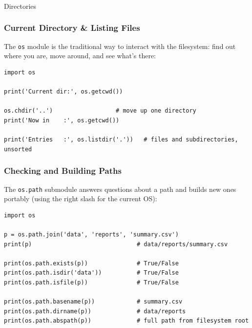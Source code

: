 \begin{frame}[fragile]\frametitle{}
\begin{center}
{\Large Directories}
\end{center}
\end{frame}

\begin{frame}[fragile]\frametitle{Current Directory \& Listing Files}
The \texttt{os} module is the traditional way to interact with the filesystem: find out where
you are, move around, and see what's there:
\begin{lstlisting}
import os

print('Current dir:', os.getcwd())

os.chdir('..')                  # move up one directory
print('Now in    :', os.getcwd())

print('Entries   :', os.listdir('.'))   # files and subdirectories, unsorted
\end{lstlisting}
\end{frame}

\begin{frame}[fragile]\frametitle{Checking and Building Paths}
The \texttt{os.path} submodule answers questions about a path and builds new ones portably
(using the right slash for the current OS):
\begin{lstlisting}
import os

p = os.path.join('data', 'reports', 'summary.csv')
print(p)                              # data/reports/summary.csv

print(os.path.exists(p))              # True/False
print(os.path.isdir('data'))          # True/False
print(os.path.isfile(p))              # True/False

print(os.path.basename(p))            # summary.csv
print(os.path.dirname(p))             # data/reports
print(os.path.abspath(p))             # full path from filesystem root
\end{lstlisting}
\end{frame}


